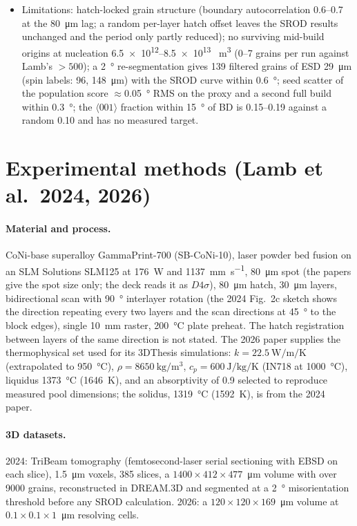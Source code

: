 \documentclass[11pt,a4paper]{article}
\newcommand{\dir}[1]{$\langle #1 \rangle$}
\begin{document}
\begin{itemize}
\item Limitations: hatch-locked grain structure (boundary autocorrelation 0.6--0.7 at the \SI{80}{\micro\metre} lag; a random per-layer hatch offset leaves the SROD results unchanged and the period only partly reduced); no surviving mid-build origins at nucleation \numrange{6.5e12}{8.5e13} \si{\per\cubic\metre} (0--7 grains per run against Lamb's $> 500$); a \SI{2}{\degree} re-segmentation gives 139 filtered grains of ESD \SI{29}{\micro\metre} (spin labels: 96, \SI{148}{\micro\metre}) with the SROD curve within \SI{0.6}{\degree}; seed scatter of the population score $\approx$\SI{0.05}{\degree} RMS on the proxy and a second full build within \SI{0.3}{\degree}; the \dir{001} fraction within \SI{15}{\degree} of BD is 0.15--0.19 against a random 0.10 and has no measured target.
\end{itemize}

\section{Experimental methods (Lamb et al.\ 2024, 2026)}
\paragraph{Material and process.} CoNi-base superalloy GammaPrint-700 (SB-CoNi-10), laser powder bed fusion on an SLM Solutions SLM125 at \SI{176}{\watt} and \SI{1137}{\milli\metre\per\second}, \SI{80}{\micro\metre} spot (the papers give the spot size only; the deck reads it as $D4\sigma$), \SI{80}{\micro\metre} hatch, \SI{30}{\micro\metre} layers, bidirectional scan with \SI{90}{\degree} interlayer rotation (the 2024 Fig.~2c sketch shows the direction repeating every two layers and the scan directions at \SI{45}{\degree} to the block edges), single \SI{10}{\milli\metre} raster, \SI{200}{\celsius} plate preheat. The hatch registration between layers of the same direction is not stated. The 2026 paper supplies the thermophysical set used for its 3DThesis simulations: $k = \SI{22.5}{\watt\per\metre\per\kelvin}$ (extrapolated to \SI{950}{\celsius}), $\rho = \SI{8650}{\kilogram\per\cubic\metre}$, $c_p = \SI{600}{\joule\per\kilogram\per\kelvin}$ (IN718 at \SI{1000}{\celsius}), liquidus \SI{1373}{\celsius} (\SI{1646}{\kelvin}), and an absorptivity of 0.9 selected to reproduce measured pool dimensions; the solidus, \SI{1319}{\celsius} (\SI{1592}{\kelvin}), is from the 2024 paper.

\paragraph{3D datasets.} 2024: TriBeam tomography (femtosecond-laser serial sectioning with EBSD on each slice), \SI{1.5}{\micro\metre} voxels, 385 slices, a $1400 \times 412 \times 477$~\si{\micro\metre} volume with over 9000 grains, reconstructed in DREAM.3D and segmented at a \SI{2}{\degree} misorientation threshold before any SROD calculation. 2026: a $120 \times 120 \times 169$~\si{\micro\metre} volume at $0.1 \times 0.1 \times 1$~\si{\micro\metre} resolving cells.
\end{document}
